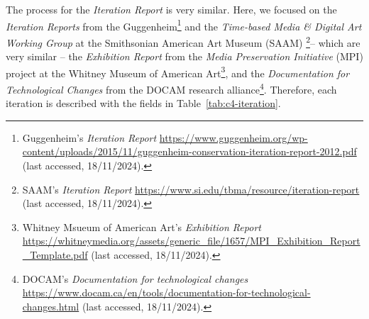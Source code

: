 The process for the \textit{Iteration Report} is very similar. Here, we focused on the \textit{Iteration Reports} from the Guggenheim\footnote{ Guggenheim’s \textit{Iteration Report} \url{https://www.guggenheim.org/wp-content/uploads/2015/11/guggenheim-conservation-iteration-report-2012.pdf} (last accessed, 18/11/2024).} and the \textit{Time-based Media \& Digital Art Working Group} at the Smithsonian American Art Museum (SAAM) \footnote{SAAM’s \textit{Iteration Report} \url{https://www.si.edu/tbma/resource/iteration-report} (last accessed, 18/11/2024).}– which are very similar – the \textit{Exhibition Report} from the \textit{Media Preservation Initiative} (MPI) project at the Whitney Museum of American Art\footnote{Whitney Msueum of American Art’s \textit{Exhibition Report} \url{https://whitneymedia.org/assets/generic_file/1657/MPI_Exhibition_Report_Template.pdf} (last accessed, 18/11/2024).}, and the \textit{Documentation for Technological Changes} from the DOCAM research alliance\footnote{DOCAM’s \textit{Documentation for technological changes} \url{https://www.docam.ca/en/tools/documentation-for-technological-changes.html} (last accessed, 18/11/2024).}. Therefore, each iteration is described with the fields in Table~\ref{tab:c4-iteration}.

